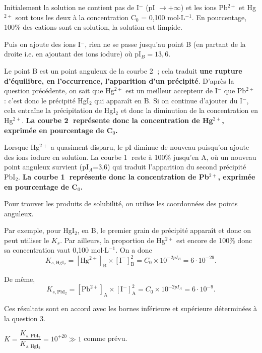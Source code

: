 \begin{solution}
\begin{questions}
\question Initialement la solution ne contient pas de I$^-$ (pI $\rightarrow + \infty$) et les ions Pb$^{2+}$ et Hg$^{2+}$ sont tous les deux à la concentration C$_0$ = 0,100 mol$\cdot$L$^{-1}$. En pourcentage, 100\% des cations sont en solution, la solution est limpide.

Puis on ajoute des ions I$^-$, rien ne se passe jusqu'au point B (en partant de la droite i.e. en ajoutant des ions iodure) où pI$_B = 13,6$. 

Le point B est un point anguleux de la courbe \textcircled{2} ; cela traduit \textbf{une rupture d'équilibre, en l'occurrence, l'apparition d'un précipité}. D'après la question précédente, on sait que Hg$^{2+}$ est un meilleur accepteur de I$^-$ que Pb$^{2+}$ : c'est donc le précipité HgI$_2$ qui apparaît en B. Si on continue d'ajouter du I$^-$, cela entraîne la précipitation de HgI$_2$ et donc la diminution de la concentration en Hg$^{2+}$. 
\textbf{La courbe \textcircled{2} représente donc la concentration de Hg$^{2+}$, exprimée en pourcentage de C$_0$.}

Lorsque Hg$^{2+}$ a quasiment disparu, le pI diminue de nouveau puisqu'on ajoute des ions iodure en solution. 
La courbe \textcircled{1} reste à 100\% jusqu'en A, où un nouveau point anguleux survient (pI$_A$=3,6) qui traduit l'apparition du second précipité PbI$_2$. 
\textbf{La courbe \textcircled{1} représente donc la concentration de Pb$^{2+}$, exprimée en pourcentage de C$_0$.}

\question Pour trouver les produits de solubilité, on utilise les coordonnées des points anguleux.

Par exemple, pour HgI$_2$, en B, le premier grain de précipité apparaît et donc on peut utiliser le $K_s$. Par ailleurs, la proportion de Hg$^{2+}$ est encore de 100\% donc sa concentration vaut 0,100 mol$\cdot$L$^{-1}$.
On a donc
$$K_{s,\mathrm{HgI_2}} = \mathrm{[Hg^{2+}]_B \times [I^-]_B^2} = C_0 \times 10^{-2pI_B} = 6 \cdot 10^{-29}.$$  

De même,
$$K_{s,\mathrm{PbI_2}} = \mathrm{[Pb^{2+}]_A \times [I^-]_A^2} = C_0 \times 10^{-2pI_A} = 6 \cdot 10^{-9}.$$   

Ces résultats sont en accord avec les bornes inférieure et supérieure déterminées à la question 3.

\question $K = \dfrac{K_{s,\mathrm{PbI_2}}}{K_{s,\mathrm{HgI_2}}} = 10^{+20} \gg 1$ comme prévu.

\end{questions}
\end{solution}